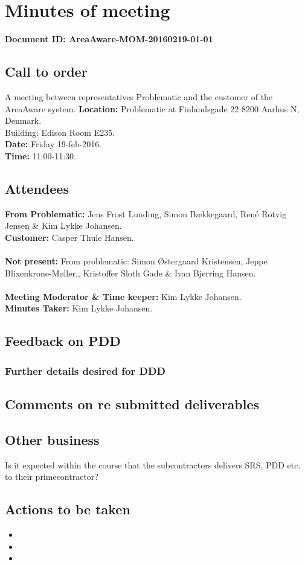 %
\thispagestyle{fancy}
\chapter*{Minutes of meeting}
\textbf{Document ID: AreaAware-MOM-20160219-01-01}


\section*{Call to order}
A meeting between representatives Problematic and the customer of the AreaAware system.
\textbf{Location:} Problematic at Finlandsgade 22 8200 Aarhus N, Denmark.\\ Building: Edison Room E235.\\
\textbf{Date:} Friday 19-feb-2016. \\
\textbf{Time:} 11:00-11:30.
\section*{Attendees}
\textbf{From Problematic:} Jens Frost Lunding, Simon Bækkegaard, René Rotvig Jensen \& Kim Lykke Johansen.\\
\textbf{Customer:} Casper Thule Hansen.\\\\
\textbf{Not present:} From problematic: Simon Østergaard Kristensen, Jeppe Blixenkrone-Møller,, Kristoffer Sloth Gade \& Ivan Bjerring Hansen.\\\\
\textbf{Meeting Moderator \& Time keeper:} Kim Lykke Johansen. \\
\textbf{Minutes Taker:} Kim Lykke Johansen.

\section*{Feedback on PDD}

\subsection*{Further details desired for DDD}


\section*{Comments on re submitted deliverables}


\section*{Other business}
Is it expected within the course that the subcontractors delivers SRS, PDD etc. to their primecontractor?

\section*{Actions to be taken}
\begin{itemize}
    \item 
    \item 
    \item 
\end{itemize}
